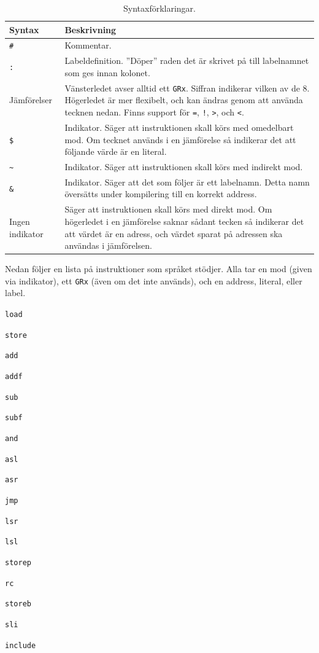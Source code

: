 \documentclass[]{article}
\begin{document}
\begin{table}[H]
\centering
\begin{tabular}{p{2.5cm} p{8.5cm}}
\textbf{Syntax} & \textbf{Beskrivning}\\
\hline
\texttt{\#} & Kommentar.\\
\texttt{:} & Labeldefinition. ''Döper'' raden det är skrivet på till labelnamnet som ges innan kolonet.\\
Jämförelser & Vänsterledet avser alltid ett \texttt{GRx}. Siffran indikerar vilken av de 8. Högerledet är mer flexibelt, och kan ändras genom att använda tecknen nedan. Finns support för \texttt{=}, \texttt{!}, \texttt{>}, och \texttt{<}.\\
\texttt{\$} & Indikator. Säger att instruktionen skall körs med omedelbart mod. Om tecknet används i en jämförelse så indikerar det att följande värde är en literal.\\
\texttt{\~{ }}  & Indikator. Säger att instruktionen skall körs med indirekt mod.\\
\texttt{\&} & Indikator. Säger att det som följer är ett labelnamn. Detta namn översätts under kompilering till en korrekt address.\\
Ingen indikator & Säger att instruktionen skall körs med direkt mod. Om högerledet i en jämförelse saknar sådant tecken så indikerar det att värdet är en adress, och värdet sparat på adressen ska användas i jämförelsen.\\
\end{tabular}
\caption{Syntaxförklaringar.}
\end{table}

\noindent
Nedan följer en lista på instruktioner som språket stödjer. Alla tar en mod (given via indikator), ett \texttt{GRx} (även om det inte används), och en address, literal, eller label.

\begin{multicols}{3}
\begin{itemize*}
\item \texttt{load}
\item \texttt{store}
\item \texttt{add}
\item \texttt{addf}
\item \texttt{sub}
\item \texttt{subf}
\item \texttt{and}
\item \texttt{asl}
\item \texttt{asr}
\item \texttt{jmp}
\item \texttt{lsr}
\item \texttt{lsl}
\item \texttt{storep}
\item \texttt{rc}
\item \texttt{storeb}
\item \texttt{sli}
\item \texttt{include}
\end{itemize*}
\end{multicols}
\end{document}
